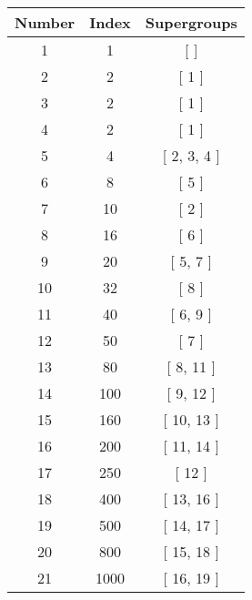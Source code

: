 \begin{center}
\begin{longtable}[H]{|| c c c ||}
\hline
Number & Index & Supergroups \\ 
\hline
1 & 1 & [  ] \\ 
\hline
2 & 2 & [ 1 ] \\ 
\hline
3 & 2 & [ 1 ] \\ 
\hline
4 & 2 & [ 1 ] \\ 
\hline
5 & 4 & [ 2, 3, 4 ] \\ 
\hline
6 & 8 & [ 5 ] \\ 
\hline
7 & 10 & [ 2 ] \\ 
\hline
8 & 16 & [ 6 ] \\ 
\hline
9 & 20 & [ 5, 7 ] \\ 
\hline
10 & 32 & [ 8 ] \\ 
\hline
11 & 40 & [ 6, 9 ] \\ 
\hline
12 & 50 & [ 7 ] \\ 
\hline
13 & 80 & [ 8, 11 ] \\ 
\hline
14 & 100 & [ 9, 12 ] \\ 
\hline
15 & 160 & [ 10, 13 ] \\ 
\hline
16 & 200 & [ 11, 14 ] \\ 
\hline
17 & 250 & [ 12 ] \\ 
\hline
18 & 400 & [ 13, 16 ] \\ 
\hline
19 & 500 & [ 14, 17 ] \\ 
\hline
20 & 800 & [ 15, 18 ] \\ 
\hline
21 & 1000 & [ 16, 19 ] \\ 
\hline
\end{longtable}
\end{center}

